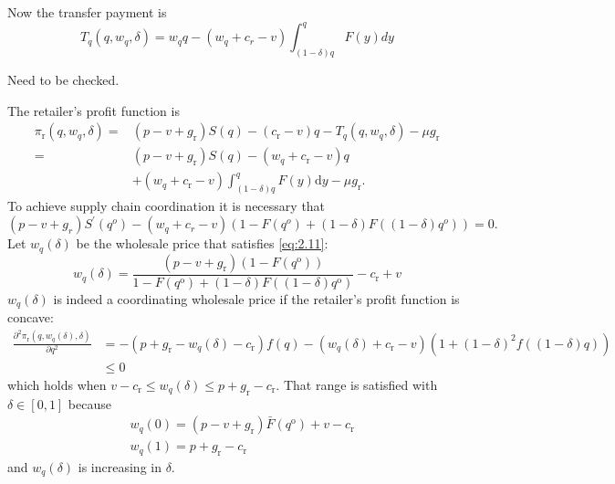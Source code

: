 Now the transfer payment is 
\begin{equation*}
    T_q(q,w_q,\delta)=w_q q-(w_q+c_r-v)\int_{(1-\delta)q}^q F(y)dy
\end{equation*}
\begin{note}
    Need to be checked.
\end{note}
The retailer's profit function is 
$$\begin{aligned}
    \pi_{\mathrm{r}}\left(q, w_{q}, \delta\right)=&\left(p-v+g_{\mathrm{r}}\right) S(q)-\left(c_{\mathrm{r}}-v\right) q-T_{q}\left(q, w_{q}, \delta\right)-\mu g_{\mathrm{r}} \\
    =&\left(p-v+g_{\mathrm{r}}\right) S(q)-\left(w_{q}+c_{\mathrm{r}}-v\right) q \\
    &+\left(w_{q}+c_{\mathrm{r}}-v\right) \int_{(1-\delta) q}^{q} F(y) \mathrm{d} y-\mu g_{\mathrm{r}}.
\end{aligned}$$
To achieve supply chain coordination it is necessary that
\begin{equation}\label{eq:2.11}
    (p-v+g_r)S^\prime(q^o)-(w_q+c_r-v)\left(1-F(q^o)+(1-\delta)F((1-\delta)q^o)\right)=0.
\end{equation}
Let $w_{q}(\delta)$ be the wholesale price that satisfies \autoref{eq:2.11}:
$$
w_{q}(\delta)=\frac{\left(p-v+g_{\mathrm{r}}\right)\left(1-F\left(q^{\mathrm{o}}\right)\right)}{1-F\left(q^{\mathrm{o}}\right)+(1-\delta) F\left((1-\delta) q^{\mathrm{o}}\right)}-c_{\mathrm{r}}+v
$$
$w_{q}(\delta)$ is indeed a coordinating wholesale price if the retailer's profit function is concave:
$$
\begin{aligned}
\frac{\partial^{2} \pi_{\mathrm{r}}\left(q, w_{q}(\delta), \delta\right)}{\partial q^{2}} &=-\left(p+g_{\mathrm{r}}-w_{q}(\delta)-c_{\mathrm{r}}\right) f(q)-\left(w_{q}(\delta)+c_{\mathrm{r}}-v\right)\left(1+(1-\delta)^{2} f((1-\delta) q)\right) \\
& \leq 0
\end{aligned}
$$
which holds when $v-c_{\mathrm{r}} \leq w_{q}(\delta) \leq p+g_{\mathrm{r}}-c_{\mathrm{r}}$. That range is satisfied with $\delta \in[0,1]$ because
$$
\begin{aligned}
&w_{q}(0)=\left(p-v+g_{\mathrm{r}}\right) \bar{F}\left(q^{\mathrm{o}}\right)+v-c_{\mathrm{r}} \\
&w_{q}(1)=p+g_{\mathrm{r}}-c_{\mathrm{r}}
\end{aligned}
$$
and $w_{q}(\delta)$ is increasing in $\delta$.

